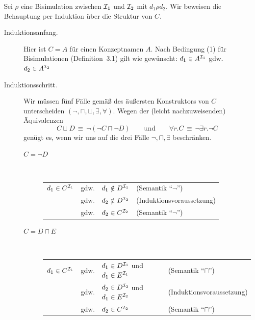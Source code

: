 \documentclass[fontsize=11pt, twoside=false, numbers=autoenddot]{scrbook}
\begin{document}
\par\noindent
\begin{beweis}
  Sei $\rho$ eine Bisimulation zwischen $\mathcal{I}_1$ und $\mathcal{I}_2$ mit $d_1\rho d_2$.
  Wir beweisen die Behauptung per Induktion über die Struktur von $C$.
  \begin{description}
    \item[Induktionsanfang.]
      Hier ist $C=A$ für einen Konzeptnamen $A$.
      Nach Bedingung (1) für Bisimulationen (Definition~3.1) gilt wie gewünscht:
      $d_1 \in A^{\mathcal{I}_1}$ gdw. $d_2 \in A^{\mathcal{I}_2}$
    \item[Induktionsschritt.]
      Wir müssen fünf Fälle gemäß des äußersten Konstruktors
      von $C$ unterscheiden $(\lnot,\sqcap,\sqcup,\exists,\forall)$.
      Wegen der (leicht nachzuweisenden) Äquivalenzen
      \[
        C \sqcup D  \,\equiv\, \lnot(\lnot C \sqcap \lnot D)
        \qquad\text{und}\qquad
        \forall r.C \,\equiv\, \lnot \exists r.\lnot C
      \]
      genügt es, wenn wir uns auf die drei Fälle $\lnot,\sqcap,\exists$ beschränken.
      \begin{description}
        \item[{\boldmath $C=\lnot D$}]
          ~ %
          \parI
          \begin{center}
            \begin{tabular}{@{}llp{40mm}l@{}}
              $d_1 \in C^{\mathcal{I}_1}$ & gdw. & $d_1 \notin D^{\mathcal{I}_1}$ & (Semantik "`$\lnot$"') \\
                                   & gdw. & $d_2 \notin D^{\mathcal{I}_2}$ & (Induktionsvoraussetzung) \\
                                   & gdw. & $d_2 \in C^{\mathcal{I}_2}$    & (Semantik "`$\lnot$"')
            \end{tabular}
          \end{center}
          \parI
        \item[{\boldmath $C=D \sqcap E$}]
          ~ %
          \parI
          \begin{center}
            \begin{tabular}{@{}llp{40mm}l@{}}
              $d_1 \in C^{\mathcal{I}_1}$
              & gdw. & $d_1 \in D^{\mathcal{I}_1}$ und $d_1 \in E^{\mathcal{I}_1}$ & (Semantik "`$\sqcap$"') \\
              & gdw. & $d_2 \in D^{\mathcal{I}_2}$ und $d_1 \in E^{\mathcal{I}_2}$ & (Induktionsvoraussetzung)\\
              & gdw. & $d_2 \in C^{\mathcal{I}_2}$                          & (Semantik "`$\sqcap$"')

\end{tabular}
\end{center}
\end{description}
\end{description}
\end{beweis}
\end{document}
